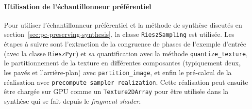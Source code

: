 \paragraph{Utilisation de l'échantillonneur préférentiel}

Pour utiliser l'échantillonneur préférentiel et la méthode de synthèse discutés en section~\ref{sec:pc-preserving-synthesis}, la classe \texttt{RieszSampling} est utilisée. Les étapes à suivre sont l'extraction de la congruence de phases de l'exemple d'entrée (avec la classe \texttt{RieszPyr}) et sa quantification avec la méthode \texttt{quantize\_texture}, le partitionnement de la texture en différentes composantes (typiquement deux, les pavés et l'arrière-plan) avec \texttt{partition\_image}, et enfin le pré-calcul de la réalisation avec \texttt{precompute\_sampler\_realization}. Cette réalisation peut ensuite être chargée sur GPU comme un \texttt{Texture2DArray} pour être utilisée dans la synthèse qui se fait depuis le \textit{fragment shader}.
